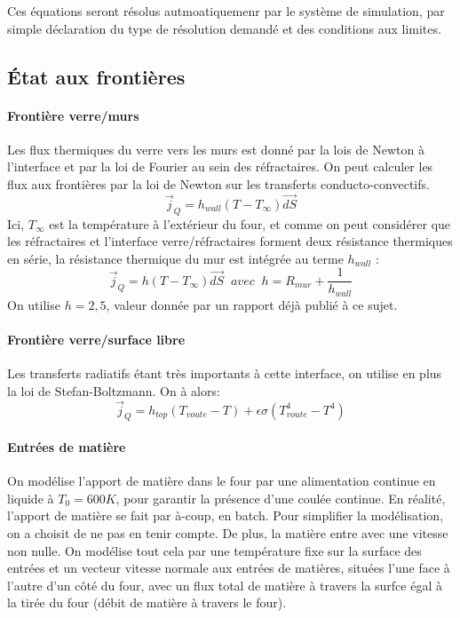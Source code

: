 \documentclass[12pt, a4paper, french, BCOR = 0pt, DIV = 10]{scrartcl}
\begin{document}
    Ces équations seront résolus autmoatiquemenr par le système de simulation, par simple déclaration du type de résolution demandé et des conditions aux limites.

        
    \subsection{État aux frontières}
    
    \paragraph{Frontière verre/murs}
    Les flux thermiques du verre vers les murs est donné par la lois de Newton à l'interface et par la loi de Fourier au sein des réfractaires. On peut calculer les flux aux frontières par la loi de Newton sur les transferts conducto-convectifs.
    $$
    \vec{j}_{Q} = h_{wall} (T - T_{\infty}) \vec{dS}
    $$
    Ici, $T_{\infty}$ est la température à l'extérieur du four, et comme on peut considérer que les réfractaires et l'interface verre/réfractaires forment deux résistance thermiques en série, la résistance thermique du mur est intégrée au terme $h_{wall}$ :
    $$\vec{j}_{Q} = h (T - T_{\infty}) \vec{dS}\;\; avec \;\;h = R_{mur} + \frac{1}{h_{wall}}
    $$
    On utilise $h = 2,5$, valeur donnée par un rapport déjà publié à ce sujet.

    \paragraph{Frontière verre/surface libre}
    Les transferts radiatifs étant très importants à cette interface, on utilise en plus la loi de Stefan-Boltzmann. On à alors:
    $$
        \vec{j}_{Q} = h_{top}(T_{voute} - T) + \epsilon\sigma(T_{voute}^{4} - T^{4})
    $$

    \paragraph{Entrées de matière}
    On modélise l'apport de matière dans le four par une alimentation continue en liquide à $T_{0} = 600K$, pour garantir la présence d'une coulée continue. En réalité, l'apport de matière se fait par à-coup, en batch. Pour simplifier la modélisation, on a choisit de ne pas en tenir compte. De plus, la matière entre avec une vitesse non nulle. On modélise tout cela par une température fixe sur la surface des entrées et un vecteur vitesse normale aux entrées de matières, situées l'une face à l'autre d'un côté du four, avec un flux total de matière à travers la surfce égal à la tirée du four (débit de matière à travers le four).
\end{document}
